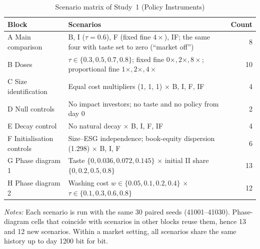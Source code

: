 \documentclass[11pt]{article}
\begin{document}
\begin{table}[t]
\centering
\small
\begin{threeparttable}
\caption{Scenario matrix of Study~1 (Policy Instruments)}
\label{tab:matrix}
\begin{tabular}{@{}p{3.6cm}p{10.4cm}r@{}}
\toprule
Block & Scenarios & Count \\
\midrule
A Main comparison & B, I ($\tau=0.6$), F (fixed fine $4\times$), IF; the same four with taste set to zero (``market off'') & 8 \\
B Doses & $\tau \in \{0.3, 0.5, 0.7, 0.8\}$; fixed fine $0\times, 2\times, 8\times$; proportional fine $1\times, 2\times, 4\times$ & 10 \\
C Size identification & Equal cost multipliers (1, 1, 1) $\times$ B, I, F, IF & 4 \\
D Null controls & No impact investors; no taste and no policy from day 0 & 2 \\
E Decay control & No natural decay $\times$ B, I, F, IF & 4 \\
F Initialisation controls & Size--ESG independence; book-equity dispersion (1.298) $\times$ B, I, F & 6 \\
G Phase diagram 1 & Taste $\{0, 0.036, 0.072, 0.145\}$ $\times$ initial II share $\{0, 0.2, 0.5, 0.8\}$ & 13 \\
H Phase diagram 2 & Washing cost $w \in \{0.05, 0.1, 0.2, 0.4\}$ $\times$ $\tau \in \{0.1, 0.3, 0.6, 0.8\}$ & 12 \\
\bottomrule
\end{tabular}
\begin{tablenotes}[flushleft]\footnotesize
\item \textit{Notes:} Each scenario is run with the same 30 paired seeds (41001--41030). Phase-diagram cells that coincide with scenarios in other blocks reuse them, hence 13 and 12 new scenarios. Within a market setting, all scenarios share the same history up to day 1200 bit for bit.
\end{tablenotes}
\end{threeparttable}
\end{table}
\end{document}
